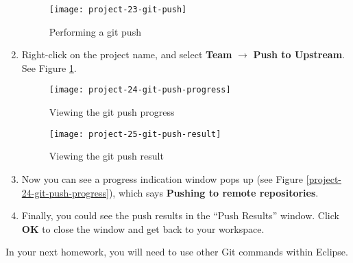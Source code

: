 \begin{enumerate}
\begin{figure}[t]
\centering
\texttt{[image: project-23-git-push]}
\caption{Performing a git push\label{project-23-git-push}}
\end{figure}

\item Right-click on the project name, and select \textbf{Team} $\rightarrow$ \textbf{Push to Upstream}. See Figure \ref{project-23-git-push}.

\begin{figure}[t]
\hspace{-2em}
\begin{minipage}{0.5\textwidth}
\centering
\texttt{[image: project-24-git-push-progress]}
\caption{Viewing the git push progress\label{project-24-git-push-progress}}
\end{minipage}
\hfill
\begin{minipage}{0.5\textwidth}
\centering
\texttt{[image: project-25-git-push-result]}
\caption{Viewing the git push result\label{project-25-git-push-result}}
\end{minipage}
\hspace{-1em}
\end{figure}

\item Now you can see a progress indication window pops up (see Figure \ref{project-24-git-push-progress}), which says \textbf{Pushing to remote repositories}.
\item Finally, you could see the push results in the ``Push Results'' window. Click \textbf{OK} to close the window and get back to your workspace. 

\end{enumerate}

In your next homework, you will need to use other Git commands within Eclipse.
